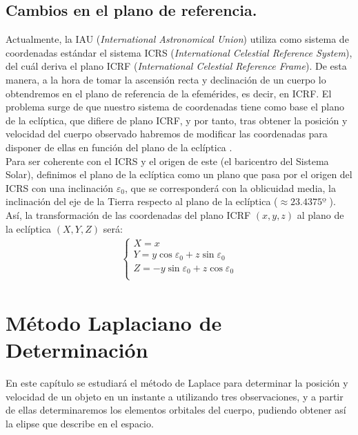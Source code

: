 \documentclass[11pt]{book}
\begin{document}
\section{Cambios en el plano de referencia.}
\label{sec:reference_plane}
Actualmente, la IAU (\textit{International Astronomical Union}) utiliza como sistema de coordenadas estándar el sistema ICRS (\textit{International Celestial Reference System}), del cuál deriva el plano ICRF (\textit{International Celestial Reference Frame}). De esta manera, a la hora de tomar la ascensión recta y declinación de un cuerpo lo obtendremos en el plano de referencia de la efemérides, es decir, en ICRF. El problema surge de que nuestro sistema de coordenadas tiene como base el plano de la eclíptica, que difiere de plano ICRF, y por tanto, tras obtener la posición y velocidad del cuerpo observado habremos de modificar las coordenadas para disponer de ellas en función del plano de la eclíptica \cite{ICRF}.\\

Para ser coherente con el ICRS y el origen de este (el baricentro del Sistema Solar), definimos el plano de la eclíptica como un plano que pasa por el origen del ICRS con una inclinación $\varepsilon_0$, que se corresponderá con la oblicuidad media, la inclinación del eje de la Tierra respecto al plano de la eclíptica \cite{ICRF} ($\approx23.4375º$ \cite{jpl}). Así, la transformación de las coordenadas del plano ICRF $(x,y,z)$ al plano de la eclíptica $(X,Y,Z)$ será:
\begin{align}
\left\{
\begin{array}{l}
	X=x\\
	Y=y\cos{\varepsilon_0}+z\sin{\varepsilon_0}\\
	Z=-y\sin{\varepsilon_0}+z\cos{\varepsilon_0}\\
\end{array}
\right.
\label{eq:ICRS_to_ecliptic}
\end{align}




\newpage
\thispagestyle{empty}













\chapter{Método Laplaciano de Determinación}
\label{chap:laplace_method}
En este capítulo se estudiará el método de Laplace para determinar la posición y velocidad de un objeto en un instante a utilizando tres observaciones, y a partir de ellas determinaremos los elementos orbitales del cuerpo, pudiendo obtener así la elipse que describe en el espacio.\\
\end{document}
